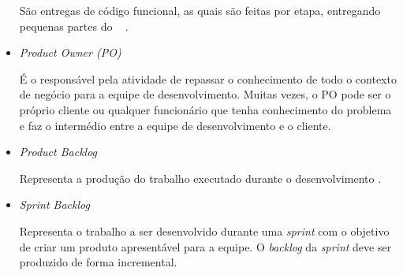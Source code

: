 \begin{itemize}
		São entregas de código funcional, as quais são feitas por etapa, entregando pequenas partes do \sw~ \cite{beck2000extreme}.

	\item \textit{Product Owner (PO)}

		É o responsável pela atividade de repassar o conhecimento de todo o contexto de negócio para a equipe de desenvolvimento. Muitas vezes, o PO pode ser o próprio cliente ou qualquer funcionário que tenha conhecimento do problema e faz o intermédio entre a equipe de desenvolvimento e o cliente. \cite{beck2000extreme}

	\item \textit{Product Backlog}

		Representa a produção do trabalho executado durante o desenvolvimento \cite{sanches2010aplicaccao}.

	\item \textit{Sprint Backlog}

		Representa o trabalho a ser desenvolvido durante uma \textit{sprint} com o objetivo de criar um produto apresentável para a equipe. O \textit{backlog} da \textit{sprint} deve ser produzido de forma incremental.

\end{itemize}